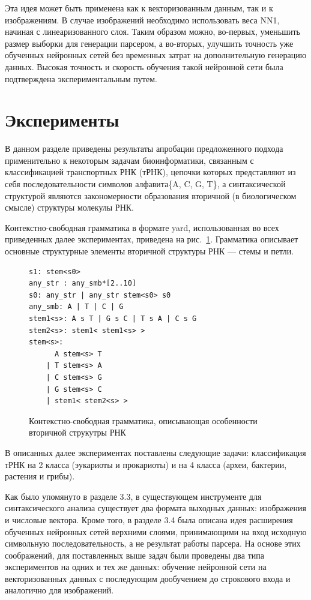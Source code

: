 \documentclass[14pt]{matmex-diploma-custom}
\begin{document}
Эта идея может быть применена как к векторизованным данным, так и к изображениям. В случае изображений необходимо использовать веса NN1, начиная с линеаризованного слоя. Таким образом можно, во-первых, уменьшить размер выборки для генерации парсером, а во-вторых, улучшить точность уже обученных нейронных сетей без временных затрат на дополнительную генерацию данных. Высокая точность и скорость обучения такой нейронной сети была подтверждена экспериментальным путем. 

\section{Эксперименты}
В данном разделе приведены результаты апробации предложенного подхода применительно к некоторым задачам биоинформатики, связанным с классификацией транспортных РНК (тРНК), цепочки которых представляют из себя последовательности символов алфавита\linebreak \{A, C, G, T\}, а синтаксической структурой являются закономерности образования вторичной (в биологическом смысле) структуры молекулы РНК. 

Контекстно-свободная грамматика в формате yard, использованная во всех приведенных далее экспериментах, приведена на рис.~\ref{rna}. Грамматика описывает основные структурные элементы вторичной структуры РНК --- стемы и петли.

\vspace{10}
\begin{figure} [h]
\begin{verbatim}
s1: stem<s0>
any_str : any_smb*[2..10]
s0: any_str | any_str stem<s0> s0
any_smb: A | T | C | G
stem1<s>: A s T | G s C | T s A | C s G 
stem2<s>: stem1< stem1<s> >
stem<s>:  
      A stem<s> T 
    | T stem<s> A 
    | C stem<s> G 
    | G stem<s> C 
    | stem1< stem2<s> >  
\end{verbatim}
\caption{Контекстно-свободная грамматика, описывающая особенности вторичной струкутры РНК}
\label{rna}
\end{figure}

В описанных далее экспериментах поставлены следующие задачи: классификация тРНК на 2 класса (эукариоты и прокариоты) и на 4 класса (археи, бактерии, растения и грибы).

Как было упомянуто в разделе 3.3, в существующем инструменте для синтаксического анализа существует два формата выходных данных: изображения и числовые вектора. Кроме того, в разделе 3.4 была описана идея расширения обученных нейронных сетей верхними слоями, принимающими на вход исходную символьную последовательность, а не результат работы парсера. На основе этих соображений, для поставленных выше задач были проведены два типа экспериментов на одних и тех же данных: обучение нейронной сети на векторизованных данных с последующим дообучением до строкового входа и аналогично для изображений.
\end{document}
